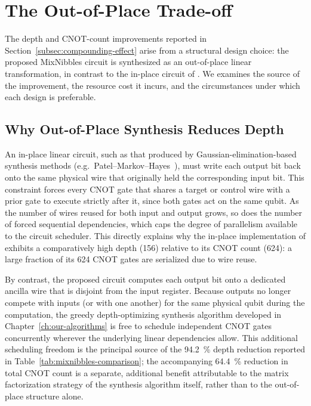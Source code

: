 \section{The Out-of-Place Trade-off}
\label{sec:out-of-place-tradeoff}

The depth and CNOT-count improvements reported in Section~\ref{subsec:compounding-effect} arise from a structural design choice: the proposed MixNibbles circuit is synthesized as an out-of-place linear transformation, in contrast to the in-place circuit of \cite{cryptoeprint:2026/1007}. We examines the source of the improvement, the resource cost it incurs, and the circumstances under which each design is preferable.

\subsection{Why Out-of-Place Synthesis Reduces Depth}

An in-place linear circuit, such as that produced by Gaussian-elimination-based synthesis methods (e.g.\ Patel--Markov--Hayes~\cite{markov2008optimal}), must write each output bit back onto the same physical wire that originally held the corresponding input bit. This constraint forces every CNOT gate that shares a target or control wire with a prior gate to execute strictly after it, since both gates act on the same qubit. As the number of wires reused for both input and output grows, so does the number of forced sequential dependencies, which caps the degree of parallelism available to the circuit scheduler. This directly explains why the in-place implementation of \cite{cryptoeprint:2026/1007} exhibits a comparatively high depth (\num{156}) relative to its CNOT count (\num{624}): a large fraction of its \num{624} CNOT gates are serialized due to wire reuse.

By contrast, the proposed circuit computes each output bit onto a dedicated ancilla wire that is disjoint from the input register. Because outputs no longer compete with inputs (or with one another) for the same physical qubit during the computation, the greedy depth-optimizing synthesis algorithm developed in Chapter~\ref{ch:our-algorithms} is free to schedule independent CNOT gates concurrently wherever the underlying linear dependencies allow. This additional scheduling freedom is the principal source of the \SI{94.2}{\percent} depth reduction reported in Table~\ref{tab:mixnibbles-comparison}; the accompanying \SI{64.4}{\percent} reduction in total CNOT count is a separate, additional benefit attributable to the matrix factorization strategy of the synthesis algorithm itself, rather than to the out-of-place structure alone.

